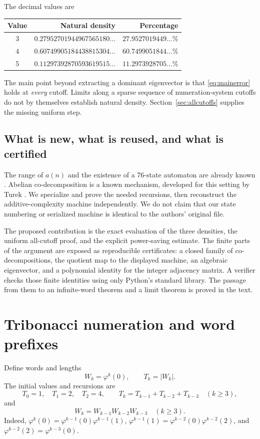 \documentclass[11pt,a4paper]{article}
\theoremstyle{definition}
\theoremstyle{remark}
\begin{document}
The decimal values are
\begin{center}
\begin{tabular}{@{}crr@{}}
\toprule
Value & Natural density & Percentage\\
\midrule
$3$ & $0.27952701944967565180\ldots$ & $27.9527019449\ldots\%$\\
$4$ & $0.60749905184438815304\ldots$ & $60.7499051844\ldots\%$\\
$5$ & $0.11297392870593619515\ldots$ & $11.2973928705\ldots\%$\\
\bottomrule
\end{tabular}
\end{center}

The main point beyond extracting a dominant eigenvector is that
\eqref{eq:mainerror} holds at \emph{every} cutoff. Limits along a sparse
sequence of numeration-system cutoffs do not by themselves establish natural
density. Section~\ref{sec:allcutoffs} supplies the missing uniform step.

\subsection{What is new, what is reused, and what is certified}
The range of $a(n)$ and the existence of a 76-state automaton are already
known \cite{PSS}. Abelian co-decomposition is a known mechanism, developed
for this setting by Turek \cite{Turek}. We specialize and prove the needed
recursions, then reconstruct the additive-complexity machine independently.
We do not claim that our state numbering or serialized machine is identical
to the authors' original file.

The proposed contribution is the exact evaluation of the three densities,
the uniform all-cutoff proof, and the explicit power-saving estimate.
The finite parts of the argument are exposed as reproducible certificates:
a closed family of co-decompositions, the quotient map to the displayed
machine, an algebraic eigenvector, and a polynomial identity for the integer
adjacency matrix. A verifier checks those finite identities using only
Python's standard library. The passage from them to an infinite-word theorem
and a limit theorem is proved in the text.

\section{Tribonacci numeration and word prefixes}
\label{sec:numeration}

Define words and lengths
\[
 W_k=\varphi^k(0),\qquad T_k=|W_k|.
\]
The initial values and recursions are
\begin{equation}\label{eq:Trec}
 T_0=1,\quad T_1=2,\quad T_2=4,\qquad
 T_k=T_{k-1}+T_{k-2}+T_{k-3}\quad(k\ge3),
\end{equation}
and
\begin{equation}\label{eq:Wrec}
 W_k=W_{k-1}W_{k-2}W_{k-3}\quad(k\ge3).
\end{equation}
Indeed, $\varphi^k(0)=\varphi^{k-1}(0)\varphi^{k-1}(1)$,
$\varphi^{k-1}(1)=\varphi^{k-2}(0)\varphi^{k-2}(2)$, and
$\varphi^{k-2}(2)=\varphi^{k-3}(0)$.
\end{document}
